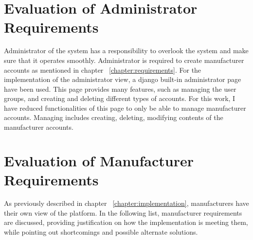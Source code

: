 \section{Evaluation of Administrator Requirements}

Administrator of the system has a responsibility to overlook the system and make sure that it operates smoothly. Administrator is required to create manufacturer accounts as mentioned in chapter ~\ref{chapter:requirements}. For the implementation of the administrator view, a django built-in administrator page have been used. This page provides many features, such as managing the user groups, and creating and deleting different types of accounts. For this work, I have reduced functionalities of this page to only be able to manage manufacturer accounts. Managing includes creating, deleting, modifying contents of the manufacturer accounts.

\section{Evaluation of Manufacturer Requirements}

As previously described in chapter ~\ref{chapter:implementation}, manufacturers have their own view of the platform. In the following list, manufacturer requirements are discussed, providing justification on how the implementation is meeting them, while pointing out shortcomings and possible alternate solutions.


